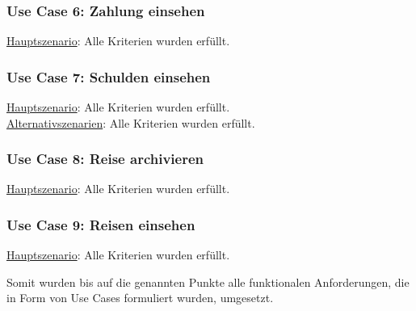 \subsubsection*{Use Case 6: Zahlung einsehen}

\begin{addmargin}{10pt}
\underline{Hauptszenario}: Alle Kriterien wurden erfüllt.\\
\end{addmargin}

\subsubsection*{Use Case 7: Schulden einsehen}

\begin{addmargin}{10pt}
\underline{Hauptszenario}: Alle Kriterien wurden erfüllt.\\
\underline{Alternativszenarien}: Alle Kriterien wurden erfüllt.\\
\end{addmargin}

\subsubsection*{Use Case 8: Reise archivieren}

\begin{addmargin}{10pt}
\underline{Hauptszenario}: Alle Kriterien wurden erfüllt.\\
\end{addmargin}
\subsubsection*{Use Case 9: Reisen einsehen}

\begin{addmargin}{10pt}
\underline{Hauptszenario}: Alle Kriterien wurden erfüllt.\\
\end{addmargin}
Somit wurden bis auf die genannten Punkte alle funktionalen Anforderungen, 
die in Form von Use Cases formuliert wurden, umgesetzt.

